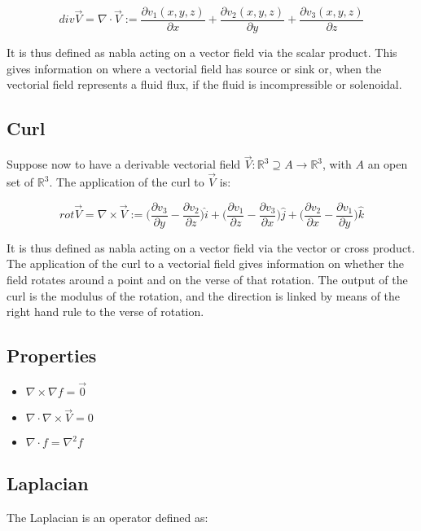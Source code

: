 	$$div\vec{V} = \nabla\cdot\vec{V} := \frac{\partial v_1(x,y,z)}{\partial x} + \frac{\partial v_2(x,y,z)}{\partial y} + \frac{\partial v_3(x,y,z)}{\partial z}$$

	It is thus defined as nabla acting on a vector field via the scalar product.
	This gives information on where a vectorial field has source or sink or, when the vectorial field represents a fluid flux, if the fluid is incompressible or solenoidal.

	\subsection{Curl}
	Suppose now to have a derivable vectorial field $\vec{V}:\mathbb{R}^3\supseteq A \rightarrow\mathbb{R}^3$, with $A$ an open set of $\mathbb{R}^3$.
	The application of the curl to $\vec{V}$ is:

	$$rot\vec{V} = \nabla\times\vec{V} := \biggl(\frac{\partial v_3}{\partial y} - \frac{\partial v_2}{\partial z}\biggr)\hat{i} + \biggl(\frac{\partial v_1}{\partial z} - \frac{\partial v_3}{\partial x}\biggr)\hat{j} + \biggl(\frac{\partial v_2}{\partial x} - \frac{\partial v_1}{\partial y}\biggr)\hat{k}$$

	It is thus defined as nabla acting on a vector field via the vector or cross product.
	The application of the curl to a vectorial field gives information on whether the field rotates around a point and on the verse of that rotation.
	The output of the curl is the modulus of the rotation, and the direction is linked by means of the right hand rule to the verse of rotation.

	\subsection{Properties}

	\begin{multicols}{3}
		\begin{itemize}
			\item $\nabla\times\nabla f = \vec{0}$
			\item $\nabla\cdot\nabla\times\vec{V} = 0$
			\item $\nabla\cdot f = \nabla^2 f$
		\end{itemize}
	\end{multicols}

	\subsection{Laplacian}
	The Laplacian is an operator defined as:

